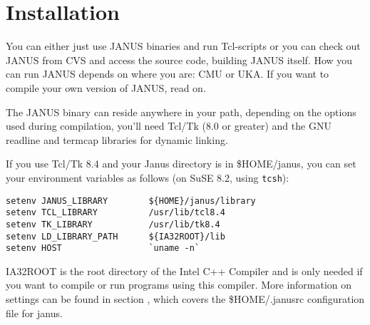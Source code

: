 

\section{Installation} \label{basic:installing}

You can either just use JANUS binaries and  run Tcl-scripts or you can
check out JANUS  from CVS and access the  source code,  building JANUS
itself. How you can run JANUS depends on where you are: CMU or UKA.
If you want to compile your own version of JANUS, read on.

The JANUS binary can reside anywhere in your path, depending on the options
used during compilation, you'll need Tcl/Tk (8.0 or greater) and the
GNU readline and termcap libraries for dynamic linking.

If you use Tcl/Tk 8.4 and your Janus directory is in \$HOME/janus, you can
set your environment variables as follows (on SuSE 8.2, using \texttt{tcsh}):

\begin{verbatim}
setenv JANUS_LIBRARY        ${HOME}/janus/library
setenv TCL_LIBRARY          /usr/lib/tcl8.4
setenv TK_LIBRARY           /usr/lib/tk8.4
setenv LD_LIBRARY_PATH      ${IA32ROOT}/lib
setenv HOST                 `uname -n`
\end{verbatim}

IA32ROOT is the root directory of the Intel C++ Compiler and is only
needed if you want to compile or run programs using this compiler.
More information on settings can be found in section ,
which covers the \$HOME/.janusrc configuration file for janus.

